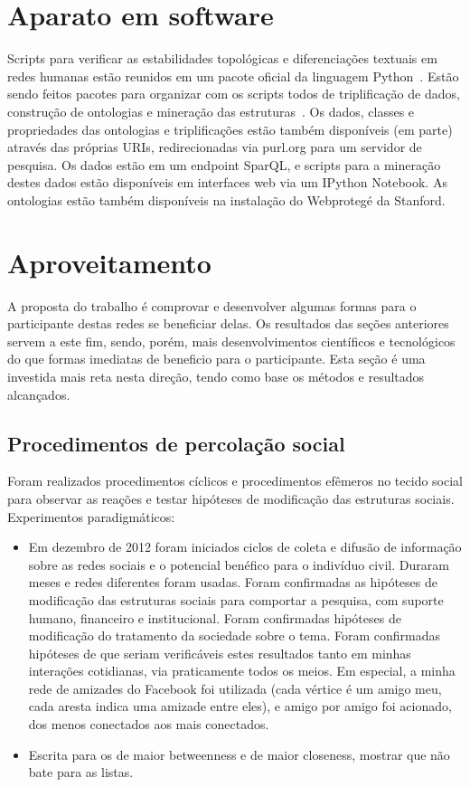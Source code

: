 \documentclass[a4paper,openright,12pt]{report} %
\begin{document}
\section{Aparato em software}
Scripts para verificar as estabilidades topológicas e diferenciações textuais em redes humanas estão reunidos em um pacote oficial da linguagem Python~\cite{gmanePack}.
Estão sendo feitos pacotes para organizar com os scripts todos
de triplificação de dados, construção de ontologias e mineração das
estruturas~\cite{participation, percolation}. 
Os dados, classes e propriedades das
ontologias e triplificações estão também disponíveis (em parte)
através das próprias URIs, redirecionadas via purl.org
para um servidor de pesquisa.
Os dados estão em um endpoint SparQL, e scripts para a mineração
destes dados estão disponíveis em interfaces web via um
IPython Notebook. As ontologias estão também disponíveis
na instalação do Webprotegé da Stanford.

\section{Aproveitamento}
A proposta do trabalho é comprovar e desenvolver algumas formas para o participante destas redes se beneficiar delas.
Os resultados das seções anteriores servem a este fim, sendo, porém, mais desenvolvimentos científicos e tecnológicos do que formas imediatas
de beneficio para o participante.
Esta seção é uma investida mais reta nesta direção, tendo como base os métodos e resultados alcançados.

\subsection{Procedimentos de percolação social}
Foram realizados procedimentos cíclicos e procedimentos efêmeros
no tecido social para observar as reações
e testar hipóteses de modificação das estruturas sociais.
Experimentos paradigmáticos:
\begin{itemize}
	\item Em dezembro de 2012 foram iniciados ciclos de
		coleta e difusão de informação sobre
		as redes sociais e o potencial benéfico para
		o indivíduo civil. Duraram meses e redes diferentes
		foram usadas. Foram confirmadas 
		as hipóteses de modificação das
		estruturas sociais para comportar a pesquisa,
		com suporte humano, financeiro e institucional.
		Foram confirmadas hipóteses de modificação
		do tratamento da sociedade sobre o tema.
		Foram confirmadas hipóteses de que seriam
		verificáveis estes resultados tanto em minhas
		interações cotidianas, via praticamente todos os meios.
		Em especial, a minha rede de amizades do Facebook
		foi utilizada (cada vértice é um amigo meu,
		cada aresta indica uma amizade entre eles), e
		amigo por amigo foi acionado,
		dos menos conectados aos mais conectados.
	\item Escrita para os de maior betweenness e de maior closeness, mostrar que não bate para as listas.
\end{itemize}
\end{document}
